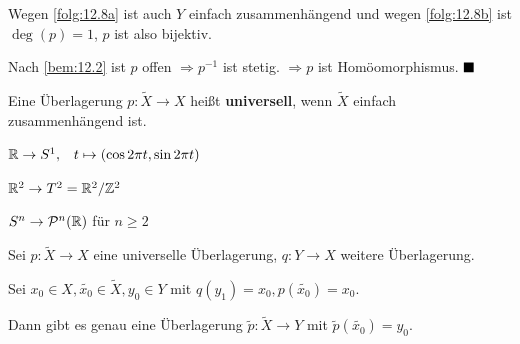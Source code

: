 \begin{beweis}
    Wegen \cref{folg:12.8a} ist auch $Y$ einfach zusammenhängend
    und wegen \cref{folg:12.8b} ist $\deg(p)=1$, $p$ ist also
    bijektiv.

    Nach \cref{bem:12.2} ist $p$ offen $\Rightarrow p^{-1}$
    ist stetig. $\Rightarrow p$ ist Homöomorphismus.  $\qed$
\end{beweis}

\begin{definition}%
    Eine Überlagerung $p: \tilde{X} \rightarrow X$ heißt
    \textbf{universell}, wenn
    $\tilde{X}$ einfach zusammenhängend ist.
\end{definition}

\begin{beispiel}
    $\mathbb{R} \rightarrow S^1, \;\;\; t \mapsto (\cos 2 \pi t, \sin 2 \pi t)$

    $\mathbb{R}^2 \rightarrow T^2 = \mathbb{R}^2 / \mathbb{Z}^2$

    $S^n \rightarrow \mathcal{P}^n(\mathbb{R})$ für $n \geq 2$
\end{beispiel}

\begin{satz}\label{thm:12.11}%
    Sei $p: \tilde{X} \rightarrow X$ eine universelle Überlagerung,
    $q:Y \rightarrow X$ weitere Überlagerung.

    Sei $x_0 \in X, \tilde{x_0} \in \tilde{X}, y_0 \in Y$ mit
    $q(y_1) = x_0, p(\tilde{x_0}) = x_0$.

    Dann gibt es genau eine Überlagerung $\tilde{p}: \tilde{X} \rightarrow Y$
    mit $\tilde{p}(\tilde{x_0}) = y_0$.
\end{satz}

